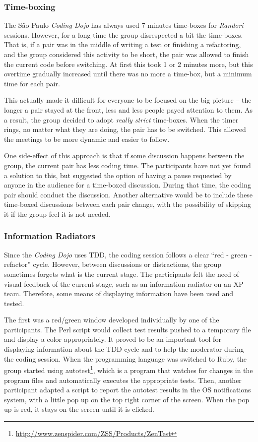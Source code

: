 \subsubsection{Time-boxing}

The São Paulo \emph{Coding Dojo} has always used 7 minutes time-boxes
for \emph{Randori} sessions. However, for a long time the group
disrespected a bit the time-boxes. That is, if a pair was in the
middle of writing a test or finishing a refactoring, and the group
considered this activity to be short, the pair was allowed to finish
the current code before switching. At first this took 1 or 2 minutes
more, but this overtime gradually increased until there was no more a
time-box, but a minimum time for each pair.

This actually made it difficult for everyone to be focused on the big
picture -- the longer a pair stayed at the front, less and less people
payed attention to them. As a result, the group decided to adopt
\emph{really strict} time-boxes. When the timer rings, no matter
what they are doing, the pair has to be switched. This allowed the
meetings to be more dynamic and easier to follow.

One side-effect of this approach is that if some discussion happens
between the group, the current pair has less coding time. The
participants have not yet found a solution to this, but suggested
the option of having a pause requested by anyone in the audience for
a time-boxed discussion. During that time, the coding pair should
conduct the discussion. Another alternative would be to include these
time-boxed discussions between each pair change, with the possibility
of skipping it if the group feel it is not needed.

\subsubsection{Information Radiators}

Since the \emph{Coding Dojo} uses TDD, the coding session follows a
clear ``red - green - refactor'' cycle. However, between discussions or
distractions, the group sometimes forgets what is the current
stage. The participants felt the need of visual feedback of the
current stage, such as an information radiator on an XP team. Therefore,
some means of displaying information have been used and tested.

The first was a red/green window developed individually by one of the
participants. The Perl script would collect test results pushed to a
temporary file and display a color appropriately. It proved to be an
important tool for displaying information about the TDD cycle and
to help the moderator during the coding session. When the programming
language was switched to Ruby, the group started using
autotest\footnote{\url{http://www.zenspider.com/ZSS/Products/ZenTest}},
which is a program that watches for changes in the program files and
automatically executes the appropriate tests. Then, another participant
adapted a script to report the autotest results in the OS notifications
system, with a little pop up on the top right corner of the screen. When
the pop up is red, it stays on the screen until it is clicked.

